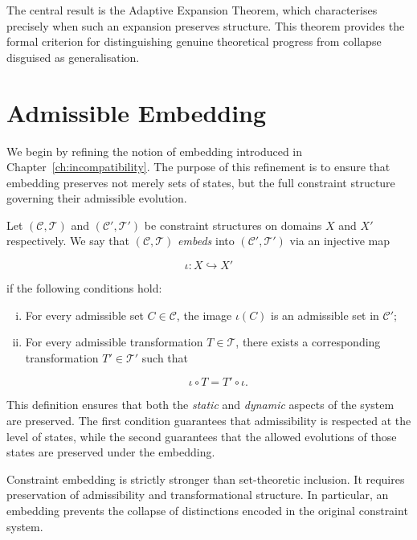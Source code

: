 \documentclass[11pt,openany]{book}
\begin{document}
The central result is the Adaptive Expansion Theorem, which
characterises precisely when such an expansion preserves
structure. This theorem provides the formal criterion for
distinguishing genuine theoretical progress from collapse
disguised as generalisation.

\section{Admissible Embedding}
\label{sec:embedding-revisited}

We begin by refining the notion of embedding introduced in
Chapter~\ref{ch:incompatibility}. The purpose of this
refinement is to ensure that embedding preserves not merely
sets of states, but the full constraint structure governing
their admissible evolution.

\begin{definition}
\label{def:embedding-refined}
Let $(\mathcal{C}, \mathcal{T})$ and
$(\mathcal{C}', \mathcal{T}')$ be constraint structures on
domains $X$ and $X'$ respectively. We say that
$(\mathcal{C}, \mathcal{T})$ \emph{embeds} into
$(\mathcal{C}', \mathcal{T}')$ via an injective map

$$
\iota : X \hookrightarrow X'
$$

if the following conditions hold:
\begin{enumerate}[(i)]
\item For every admissible set $C \in \mathcal{C}$,
the image $\iota(C)$ is an admissible set in
$\mathcal{C}'$;
\item For every admissible transformation
$T \in \mathcal{T}$, there exists a corresponding
transformation $T' \in \mathcal{T}'$ such that

$$
\iota \circ T = T' \circ \iota.
$$

\end{enumerate}
\end{definition}

This definition ensures that both the \emph{static} and
\emph{dynamic} aspects of the system are preserved. The
first condition guarantees that admissibility is respected
at the level of states, while the second guarantees that the
allowed evolutions of those states are preserved under the
embedding.

\begin{remark}
Constraint embedding is strictly stronger than set-theoretic
inclusion. It requires preservation of admissibility and
transformational structure. In particular, an embedding
prevents the collapse of distinctions encoded in the
original constraint system.
\end{remark}
\end{document}
